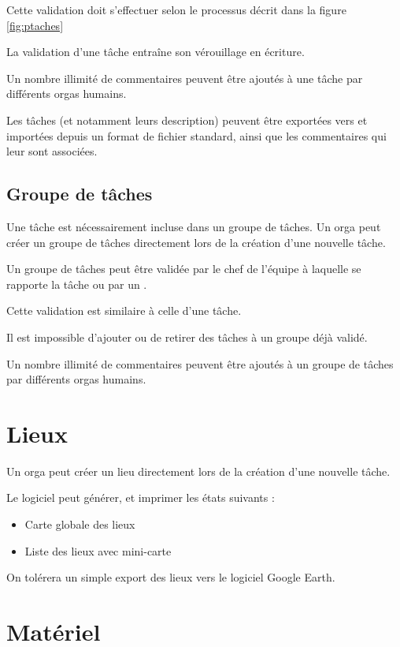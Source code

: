 Cette validation doit s'effectuer selon le processus décrit dans la figure \ref{fig:ptaches}

La validation d'une tâche entraîne son vérouillage en écriture.

Un nombre illimité de commentaires peuvent être ajoutés à une tâche par différents orgas humains.


Les tâches (et notamment leurs description) peuvent être exportées vers et importées depuis un format de fichier standard, ainsi que les commentaires qui leur sont associées.


\subsection{Groupe de tâches}
Une tâche est nécessairement incluse dans un groupe de tâches.
Un orga peut créer un groupe de tâches directement lors de la création d'une nouvelle tâche.

Un groupe de tâches peut être validée par le chef de l'équipe à laquelle se rapporte la tâche ou par un \oh{}.

Cette validation est similaire à celle d'une tâche.

Il est impossible d'ajouter ou de retirer des tâches à un groupe déjà validé.


Un nombre illimité de commentaires peuvent être ajoutés à un groupe de tâches par différents orgas humains.

\section{Lieux}
Un orga peut créer un lieu directement lors de la création d'une nouvelle tâche.

Le logiciel peut générer, et imprimer les états suivants :
\begin{itemize}
 \item Carte globale des lieux
\item Liste des lieux avec mini-carte
\end{itemize}
On tolérera un simple export des lieux vers le logiciel Google Earth\textregistered{}.

\section{Matériel}

